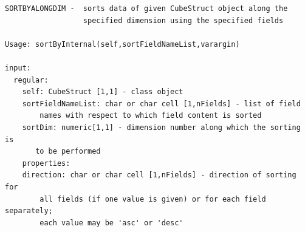 \documentclass[letterpaper,10pt,english]{sphinxmanual}
\begin{document}
\begin{Verbatim}[commandchars=\\\{\}]
SORTBYALONGDIM -  sorts data of given CubeStruct object along the
                  specified dimension using the specified fields

Usage: sortByInternal(self,sortFieldNameList,varargin)

input:
  regular:
    self: CubeStruct [1,1] - class object
    sortFieldNameList: char or char cell [1,nFields] - list of field
        names with respect to which field content is sorted
    sortDim: numeric[1,1] - dimension number along which the sorting is
       to be performed
    properties:
    direction: char or char cell [1,nFields] - direction of sorting for
        all fields (if one value is given) or for each field separately;
        each value may be 'asc' or 'desc'
\end{Verbatim}
\end{document}
